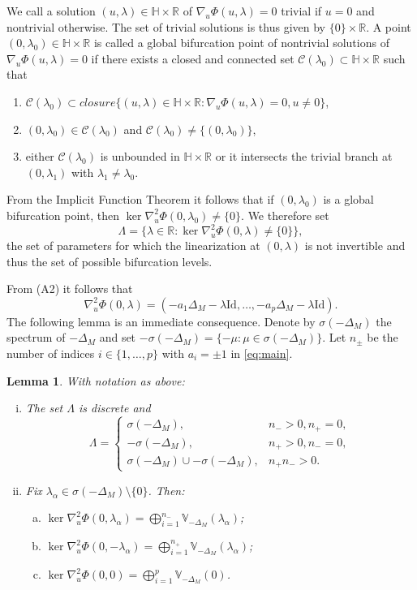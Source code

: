 \documentclass[reqno,twoside,12pt]{amsart}
\newtheorem{Lemma}[Remark]{Lemma}
\newcommand{\bH}{\mathbb{H}}
\newcommand{\bR}{\mathbb{R}}
\newcommand{\bV}{\mathbb{V}}
\newcommand{\cC}{\mathcal{C}}
\numberwithin{equation}{section} \errorcontextlines=0
\begin{document}
We call a solution $(u,\lambda)\in\bH\times\bR$ of $\nabla_u\Phi(u,\lambda)=0$ trivial if $u=0$ and nontrivial otherwise. The set of trivial solutions is thus given by $\{0\} \times \bR$. A point $(0,\lambda_0)\in\bH\times\bR$ is called a global bifurcation point of nontrivial solutions of $\nabla_u\Phi(u,\lambda)=0$ if there exists a closed and connected set $\cC(\lambda_0)\subset\bH\times\bR$ such that
\begin{enumerate}
\item $\cC(\lambda_0)\subset closure\{(u,\lambda)\in\bH\times\bR:\nabla_u\Phi(u,\lambda)=0, u\neq 0\}$,
\item $(0,\lambda_0)\in\cC(\lambda_0)$ and $\cC(\lambda_0)\neq\{(0,\lambda_0)\}$,
\item either $\cC(\lambda_0)$ is unbounded in $\bH\times\bR$ or it intersects the trivial branch at $(0,\lambda_1)$ with $\lambda_1\ne\lambda_0$.
\end{enumerate}


From the Implicit Function Theorem it follows that if $(0,\lambda_0)$ is a global bifurcation point, then $\ker\nabla_u^2\Phi(0,\lambda_0)\neq\{0\}$. We therefore set
$$
\Lambda=\{\lambda\in\bR:\ker\nabla_u^2\Phi(0,\lambda)\neq\{0\}\},
$$
the set of parameters for which the linearization at $(0,\lambda)$ is not invertible and thus the set of possible bifurcation levels.



From \textup{(A2)} it follows that
\[
\nabla_u^2\Phi(0,\lambda)=(-a_1\Delta_M-\lambda \mathrm{Id},\ldots,-a_p\Delta_M-\lambda \mathrm{Id}).
\]
The following lemma is an immediate consequence. Denote by $\sigma(-\Delta_M)$ the spectrum of $-\Delta_M$ and set $-\sigma(-\Delta_M)=\{-\mu:\mu\in\sigma(-\Delta_M)\}$. Let $n_\pm$ be the number of indices $i\in\{1,\dots,p\}$ with $a_i=\pm1$ in \eqref{eq:main}.
\begin{Lemma}\label{lem:spec-structure}
With notation as above:
\begin{enumerate}[(i)]
\item The set $\Lambda$ is discrete and
\[
\Lambda=
\begin{cases}
\sigma(-\Delta_M), & n_->0, n_+=0,\\
-\sigma(-\Delta_M), & n_+>0, n_-=0,\\
\sigma(-\Delta_M)\cup-\sigma(-\Delta_M), & n_+n_->0.
\end{cases}
\]
\item Fix $\lambda_{\alpha}\in\sigma(-\Delta_M)\setminus\{0\}$. Then:
\begin{enumerate}[(a)]
\item $\ker\nabla_u^2\Phi(0,\lambda_{\alpha})=\bigoplus_{i=1}^{n_-}\bV_{-\Delta_M}(\lambda_{\alpha})$;
\item $\ker\nabla_u^2\Phi(0,-\lambda_{\alpha})=\bigoplus_{i=1}^{n_+}\bV_{-\Delta_M}(\lambda_{\alpha})$;
\item $\ker\nabla_u^2\Phi(0,0)=\bigoplus_{i=1}^{p}\bV_{-\Delta_M}(0)$.
\end{enumerate}
\end{enumerate}
\end{Lemma}
\end{document}
